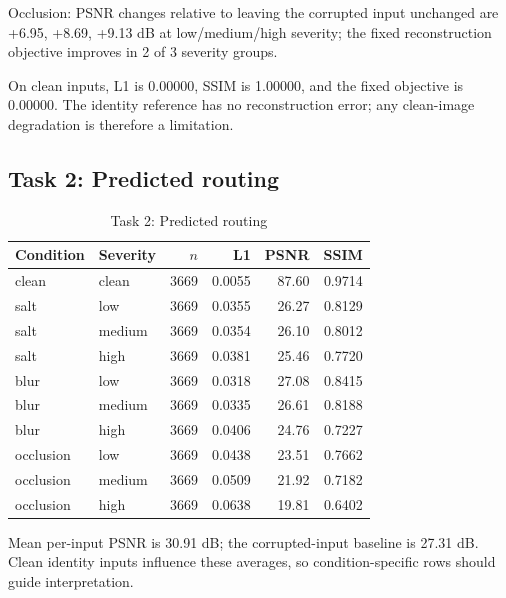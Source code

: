\documentclass[conference]{IEEEtran}
\begin{document}
Occlusion: PSNR changes relative to leaving the corrupted input unchanged are +6.95, +8.69, +9.13 dB at low/medium/high severity; the fixed reconstruction objective improves in 2 of 3 severity groups.

On clean inputs, L1 is 0.00000, SSIM is 1.00000, and the fixed objective is 0.00000. The identity reference has no reconstruction error; any clean-image degradation is therefore a limitation.

\subsection{Task 2: Predicted routing}

\begin{table}[!ht]\centering\caption{Task 2: Predicted routing}\scriptsize

\begin{tabular}{llrrrr}\toprule Condition & Severity & $n$ & L1 & PSNR & SSIM\\\midrule

clean & clean & 3669 & 0.0055 & 87.60 & 0.9714\\

salt & low & 3669 & 0.0355 & 26.27 & 0.8129\\

salt & medium & 3669 & 0.0354 & 26.10 & 0.8012\\

salt & high & 3669 & 0.0381 & 25.46 & 0.7720\\

blur & low & 3669 & 0.0318 & 27.08 & 0.8415\\

blur & medium & 3669 & 0.0335 & 26.61 & 0.8188\\

blur & high & 3669 & 0.0406 & 24.76 & 0.7227\\

occlusion & low & 3669 & 0.0438 & 23.51 & 0.7662\\

occlusion & medium & 3669 & 0.0509 & 21.92 & 0.7182\\

occlusion & high & 3669 & 0.0638 & 19.81 & 0.6402\\

\bottomrule\end{tabular}\end{table}

Mean per-input PSNR is 30.91 dB; the corrupted-input baseline is 27.31 dB. Clean identity inputs influence these averages, so condition-specific rows should guide interpretation.
\end{document}
